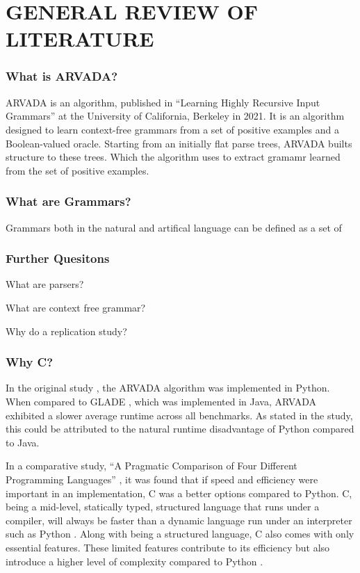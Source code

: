 \chapter{GENERAL REVIEW OF LITERATURE}

\subsection{What is ARVADA?}

ARVADA is an algorithm, published in \enquote{Learning Highly Recursive Input Grammars} \cite{kulkarniLearningHighlyRecursive2021} at the University of California, Berkeley in 2021. It is an algorithm designed to learn context-free grammars from a set of positive examples and a Boolean-valued oracle. Starting from an initially flat parse trees, ARVADA builts structure to these trees. Which the algorithm uses to extract gramamr learned from the set of positive examples.

\subsection{What are Grammars?}

Grammars both in the natural and artifical language can be defined as a set of 

\subsection{Further Quesitons}

What are parsers?

What are context free grammar?

Why do a replication study?

\subsection{Why C?}

In the original study \cite{kulkarniLearningHighlyRecursive2021}, the ARVADA algorithm was implemented in Python. When compared to GLADE \cite{bastaniSynthesizingProgramInput}, which was implemented in Java, ARVADA exhibited a slower average runtime across all benchmarks. As stated in the study, this could be attributed to the natural runtime disadvantage of Python compared to Java.

\vspace{\baselineskip}
In a comparative study, \enquote{A Pragmatic Comparison of Four Different Programming Languages} \cite{aliPragmaticComparisonFour2021}, it was found that if speed and efficiency were important in an implementation, C was a better options compared to Python. C, being a mid-level, statically typed, structured language that runs under a compiler, will always be faster than a dynamic language run under an interpreter such as Python \cite{kumarPythonLanguageComparison2022}. Along with being a structured language, C also comes with only essential features. These limited features contribute to its efficiency but also introduce a higher level of complexity compared to Python \cite{aliPragmaticComparisonFour2021}\cite{kumarPythonLanguageComparison2022}.

